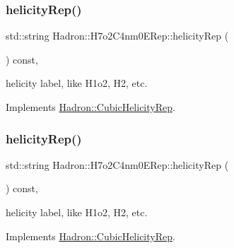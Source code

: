 \mbox{\label{structHadron_1_1H7o2C4nm0ERep_a8b56e7be3339c9a175a52017de66b6d7}} 
\subsubsection{\texorpdfstring{helicityRep()}{helicityRep()}\hspace{0.1cm}{\footnotesize\ttfamily [1/3]}}
{\footnotesize\ttfamily std\+::string Hadron\+::\+H7o2\+C4nm0\+E\+Rep\+::helicity\+Rep (\begin{DoxyParamCaption}{ }\end{DoxyParamCaption}) const\hspace{0.3cm}{\ttfamily [inline]}, {\ttfamily [virtual]}}

helicity label, like H1o2, H2, etc. 

Implements \mbox{\hyperlink{structHadron_1_1CubicHelicityRep_af1096946b7470edf0a55451cc662f231}{Hadron\+::\+Cubic\+Helicity\+Rep}}.

\mbox{\label{structHadron_1_1H7o2C4nm0ERep_a8b56e7be3339c9a175a52017de66b6d7}} 
\subsubsection{\texorpdfstring{helicityRep()}{helicityRep()}\hspace{0.1cm}{\footnotesize\ttfamily [2/3]}}
{\footnotesize\ttfamily std\+::string Hadron\+::\+H7o2\+C4nm0\+E\+Rep\+::helicity\+Rep (\begin{DoxyParamCaption}{ }\end{DoxyParamCaption}) const\hspace{0.3cm}{\ttfamily [inline]}, {\ttfamily [virtual]}}

helicity label, like H1o2, H2, etc. 

Implements \mbox{\hyperlink{structHadron_1_1CubicHelicityRep_af1096946b7470edf0a55451cc662f231}{Hadron\+::\+Cubic\+Helicity\+Rep}}.

\mbox{\label{structHadron_1_1H7o2C4nm0ERep_a8b56e7be3339c9a175a52017de66b6d7}} 
